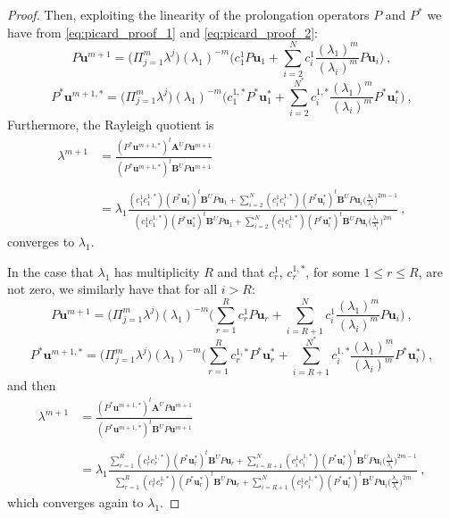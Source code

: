 \documentclass[smallextended]{svjour3}
\begin{document}
\begin{proof}
Then, exploiting the linearity of the prolongation operators $P$ and $P^*$ we have from \eqref{eq:picard_proof_1} and \eqref{eq:picard_proof_2}:
$$
P\mathbf{u}^{m+1}=\Big(\Pi_{j=1}^m\lambda^{j}\Big)(\lambda_1)^{-m}\Big( c_1^1 P\mathbf{u}_1 +
\sum_{i=2}^N c_i^1\frac{(\lambda_1)^m}{(\lambda_i)^{m}}P\mathbf{u}_i\Big) \ ,
$$
$$
P^*\mathbf{u}^{m+1,*}=\Big(\Pi_{j=1}^m\lambda^{j}\Big)(\lambda_1)^{-m}\Big( c_1^{1,*} P^*\mathbf{u}_1^* +
\sum_{i=2}^{N^*} c_i^{1,*}\frac{(\lambda_1)^m}{(\lambda_i)^{m}}P^*\mathbf{u}_i^*\Big) \ ,
$$
Furthermore, the Rayleigh quotient is
$$
\begin{array}{ll}
\displaystyle\lambda^{m+1}&\displaystyle=\frac{(P^*\mathbf{u}^{m+1,*})^t\mathbf{A}^U P\mathbf{u}^{m+1}}{(P^*\mathbf{u}^{m+1,*})^t\mathbf{B}^U P\mathbf{u}^{m+1}}\\
\\
&=\lambda_1 \frac{\displaystyle(c_1^1c_1^{1,*})(P^*\mathbf{u}^{*}_1)^t\mathbf{B}^U P\mathbf{u}_1 +
\sum_{i=2}^N (c_i^1c_i^{1,*})(P^*\mathbf{u}^{*}_i)^t\mathbf{B}^U P\mathbf{u}_i\Bigg(\frac{\lambda_1}{\lambda_i}\Bigg)^{2m-1}}
{\displaystyle(c_1^1c_1^{1,*})(P^*\mathbf{u}^{*}_1)^t\mathbf{B}^U P\mathbf{u}_1 +
\sum_{i=2}^N (c_i^1c_i^{1,*})(P^*\mathbf{u}^{*}_i)^t\mathbf{B}^U P\mathbf{u}_i\Bigg(\frac{\lambda_1}{\lambda_i}\Bigg)^{2m}}\ ,
\end{array}
$$
converges to $\lambda_1$.

In the case that $\lambda_1$ has multiplicity $R$ and that $c_r^1$, $c_r^{1,*}$, for some $1\leq r\leq R$, are not zero,
we similarly have that for all $i>R$:
$$
P\mathbf{u}^{m+1}=\Big(\Pi_{j=1}^m\lambda^{j}\Big)(\lambda_1)^{-m}\Big( \sum_{r=1}^Rc_r^1 P\mathbf{u}_r+
\sum_{i=R+1}^N c_i^1\frac{(\lambda_1)^m}{(\lambda_i)^{m}}P\mathbf{u}_i\Big) \ ,
$$
$$
P^*\mathbf{u}^{m+1,*}=\Big(\Pi_{j=1}^m\lambda^{j}\Big)(\lambda_1)^{-m}\Big( \sum_{r=1}^Rc_r^{1,*} P^*\mathbf{u}_r^*+
\sum_{i=R+1}^{N^*} c_i^{1,*}\frac{(\lambda_1)^m}{(\lambda_i)^{m}}P^*\mathbf{u}_i^*\Big) \ ,
$$
and then
$$
\begin{array}{ll}
\displaystyle\lambda^{m+1}&\displaystyle=\frac{(P^*\mathbf{u}^{m+1,*})^t\mathbf{A}^U P\mathbf{u}^{m+1}}{(P^*\mathbf{u}^{m+1,*})^t\mathbf{B}^U P\mathbf{u}^{m+1}}\\
\\
&\displaystyle=\lambda_1 \frac{\displaystyle \sum_{r=1}^R(c_r^1c_r^{1,*})(P^*\mathbf{u}^{*}_r)^t\mathbf{B}^U P\mathbf{u}_r +
\sum_{i=R+1}^N (c_i^1c_i^{1,*})(P^*\mathbf{u}^{*}_i)^t\mathbf{B}^U P\mathbf{u}_i\Bigg(\frac{\lambda_1}{\lambda_i}\Bigg)^{2m-1}}
{\displaystyle \sum_{r=1}^R(c_r^1c_r^{1,*})(P^*\mathbf{u}^{*}_r)^t\mathbf{B}^U P\mathbf{u}_r +
\sum_{i=R+1}^N (c_i^1c_i^{1,*})(P^*\mathbf{u}^{*}_i)^t\mathbf{B}^U P\mathbf{u}_i\Bigg(\frac{\lambda_1}{\lambda_i}\Bigg)^{2m}}\ ,
\end{array}
$$
which converges again to $\lambda_1$.


\end{proof}
\end{document}
